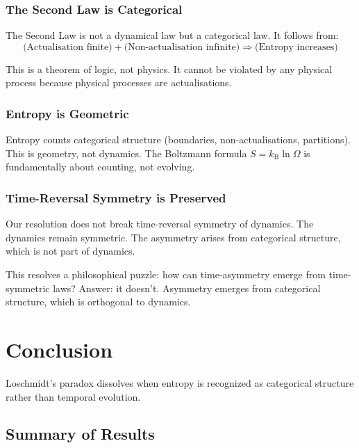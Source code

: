 \documentclass[twocolumn,10pt]{article}
\theoremstyle{definition}
\theoremstyle{remark}
\newcommand{\kB}{k_{\mathrm{B}}}
\begin{document}
\subsubsection{The Second Law is Categorical}

The Second Law is not a dynamical law but a categorical law. It follows from:
\begin{equation}
\text{(Actualisation finite)} + \text{(Non-actualisation infinite)} \Rightarrow \text{(Entropy increases)}
\end{equation}

This is a theorem of logic, not physics. It cannot be violated by any physical process because physical processes are actualisations.

\subsubsection{Entropy is Geometric}

Entropy counts categorical structure (boundaries, non-actualisations, partitions). This is geometry, not dynamics. The Boltzmann formula $S = \kB \ln \Omega$ is fundamentally about counting, not evolving.

\subsubsection{Time-Reversal Symmetry is Preserved}

Our resolution does not break time-reversal symmetry of dynamics. The dynamics remain symmetric. The asymmetry arises from categorical structure, which is not part of dynamics.

This resolves a philosophical puzzle: how can time-asymmetry emerge from time-symmetric laws? Answer: it doesn't. Asymmetry emerges from categorical structure, which is orthogonal to dynamics.

\section{Conclusion}
\label{sec:conclusion}

Loschmidt's paradox dissolves when entropy is recognized as categorical structure rather than temporal evolution.

\subsection{Summary of Results}
\end{document}
